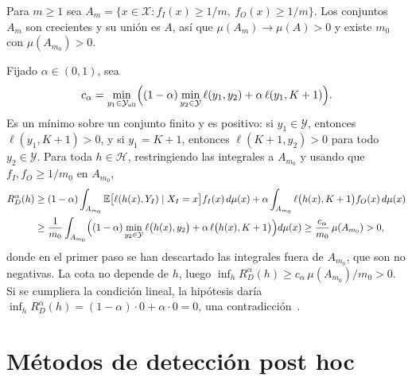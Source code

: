 \begin{demostracion}
Para $m \geq 1$ sea $A_m = \{x \in \mathcal{X} : f_I(x) \geq 1/m,\ f_O(x) \geq 1/m\}$. Los conjuntos $A_m$ son crecientes y su unión es $A$, así que $\mu(A_m) \to \mu(A) > 0$ y existe $m_0$ con $\mu(A_{m_0}) > 0$.

Fijado $\alpha \in (0, 1)$, sea
\[
  c_\alpha = \min_{y_1 \in \mathcal{Y}_{\mathrm{all}}} \Bigl( (1 - \alpha) \min_{y_2 \in \mathcal{Y}} \ell(y_1, y_2) + \alpha\, \ell(y_1, K + 1) \Bigr).
\]
Es un mínimo sobre un conjunto finito y es positivo: si $y_1 \in \mathcal{Y}$, entonces $\ell(y_1, K+1) > 0$, y si $y_1 = K + 1$, entonces $\ell(K+1, y_2) > 0$ para todo $y_2 \in \mathcal{Y}$. Para toda $h \in \mathcal{H}$, restringiendo las integrales a $A_{m_0}$ y usando que $f_I, f_O \geq 1/m_0$ en $A_{m_0}$,
\begin{align*}
  R^{\alpha}_{D}(h)
  &\geq (1 - \alpha) \int_{A_{m_0}} \operatorname{\mathbb{E}}\bigl[\ell(h(x), Y_I) \mid X_I = x\bigr] f_I(x)\, d\mu(x)
     + \alpha \int_{A_{m_0}} \ell\bigl(h(x), K+1\bigr) f_O(x)\, d\mu(x) \\
  &\geq \frac{1}{m_0} \int_{A_{m_0}} \Bigl( (1 - \alpha) \min_{y_2 \in \mathcal{Y}} \ell\bigl(h(x), y_2\bigr) + \alpha\, \ell\bigl(h(x), K+1\bigr) \Bigr) d\mu(x)
  \geq \frac{c_\alpha}{m_0}\, \mu(A_{m_0}) > 0 ,
\end{align*}
donde en el primer paso se han descartado las integrales fuera de $A_{m_0}$, que son no negativas. La cota no depende de $h$, luego $\inf_{h} R^{\alpha}_{D}(h) \geq c_\alpha\, \mu(A_{m_0}) / m_0 > 0$. Si se cumpliera la condición lineal, la hipótesis daría $\inf_h R^{\alpha}_{D}(h) = (1 - \alpha) \cdot 0 + \alpha \cdot 0 = 0$, una contradicción~\cite[ap.~G.1]{fang2022}.
\end{demostracion}

\section{Métodos de detección post hoc}\label{sec:dem-posthoc}

